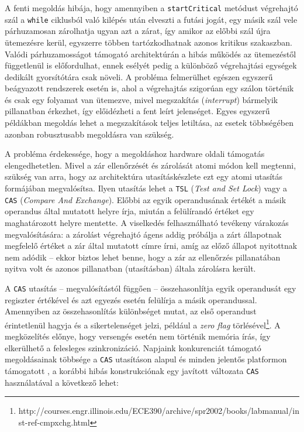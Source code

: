     A fenti megoldás hibája, hogy amennyiben a \texttt{startCritical} metódust végrehajtó szál a \texttt{while} ciklusból való kilépés után elveszti a futási jogát, egy másik szál vele párhuzamosan zárolhatja ugyan azt a zárat, így amikor az előbbi szál újra ütemezésre kerül, egyszerre többen tartózkodhatnak azonos kritikus szakaszban. Valódi párhuzamosságot támogató architektúrán a hibás működés az ütemezéstől függetlenül is előfordulhat, ennek esélyét pedig a különböző végrehajtási egységek dedikált gyorsítótára csak növeli. A probléma felmerülhet egészen egyszerű beágyazott rendszerek esetén is, ahol a végrehajtás szigorúan egy szálon történik és csak egy folyamat van ütemezve, mivel megszakítás (\emph{interrupt}) bármelyik pillanatban érkezhet, így előidézheti a fent leírt jelenséget. Egyes egyszerű példákban megoldás lehet a megszakítások teljes letiltása, az esetek többségében azonban robusztusabb megoldásra van szükség.
    
    A probléma érdekessége, hogy a megoldáshoz hardware oldali támogatás elengedhetetlen. Mivel a zár ellenőrzését és zárolását atomi módon kell megtenni, szükség van arra, hogy az architektúra utasításkészlete ezt egy atomi utasítás formájában megvalósítsa. Ilyen utasítás lehet a \texttt{TSL} (\emph{Test and Set Lock}) vagy a \texttt{CAS} (\emph{Compare And Exchange}). Előbbi az egyik operandusának értékét a másik operandus által mutatott helyre írja, miután a felülírandó értéket egy maghatározott helyre mentette. A viselkedés felhasználható tevékeny várakozás megvalósítására: a zárolást végrehajtó ágens addig próbálja a zárt állapotnak megfelelő értéket a zár által mutatott címre írni, amíg az előző állapot nyitottnak nem adódik -- ekkor biztos lehet benne, hogy a zár az ellenőrzés pillanatában nyitva volt és azonos pillanatban (utasításban) általa zárolásra került.
    
    A \texttt{CAS} utasítás -- megvalósítástól függően -- összehasonlítja egyik operandusát egy regiszter értékével és azt egyezés esetén felülírja a másik operandussal. Amennyiben az összehasonlítás különbséget mutat, az első operandust érintetlenül hagyja és a sikertelenséget jelzi, például a \emph{zero flag} törlésével\footnote{http://courses.engr.illinois.edu/ECE390/archive/spr2002/books/labmanual/inst-ref-cmpxchg.html}. A megközelítés előnye, hogy versengés esetén nem történik memória írás, így elkerülhető a felesleges szinkronizáció. Napjaink konkurenciát támogató megoldásainak többsége a \texttt{CAS} utasításon alapul és minden jelentős platformon támogatott \cite{DiceEtAl}, a korábbi hibás konstrukciónak egy javított változata \texttt{CAS} használatával a következő lehet:
    

